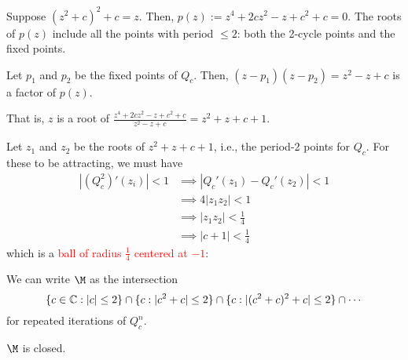 \documentclass[class=pmath370,tikz,notes]{agony}
\begin{document}
Suppose $(z^2+c)^2+c = z$. Then, $p(z) := z^4+2cz^2-z+c^2+c=0$.
The roots of $p(z)$ include all the points with period $\leq 2$:
both the 2-cycle points and the fixed points.

Let $p_1$ and $p_2$ be the fixed points of $Q_c$.
Then, $(z-p_1)(z-p_2) = z^2-z+c$ is a factor of $p(z)$.

That is, $z$ is a root of $\frac{z^4+2cz^2-z+c^2+c}{z^2-z+c} = z^2+z+c+1$.

Let $z_1$ and $z_2$ be the roots of $z^2+z+c+1$, i.e., the period-2 points for $Q_c$.
For these to be attracting, we must have
\begin{align*}
  |(Q_c^2)'(z_i)|<1 & \implies |Q_c'(z_1)-Q_c'(z_2)|<1 \\
                    & \implies 4|z_1z_2| < 1           \\
                    & \implies |z_1z_2| < \frac{1}{4}  \\
                    & \implies |c+1| < \frac{1}{4}
\end{align*}
which is a \textcolor{red}{ball of radius $\frac14$ centered at $-1$}:
\begin{center}
\end{center}

\begin{prop}
  We can write $\M$ as the intersection
  \[
    \{c \in \mathbb{C}: |c| \leq 2\}
    \cap \{c: |c^2+c| \leq 2\}
    \cap \{c: |(c^2+c)^2+c| \leq 2\} \cap \cdots
  \]
  for repeated iterations of $Q_c^n$.
\end{prop}

\begin{prop}
  $\M$ is closed.
\end{prop}

\begin{center}
\end{center}
\end{document}
